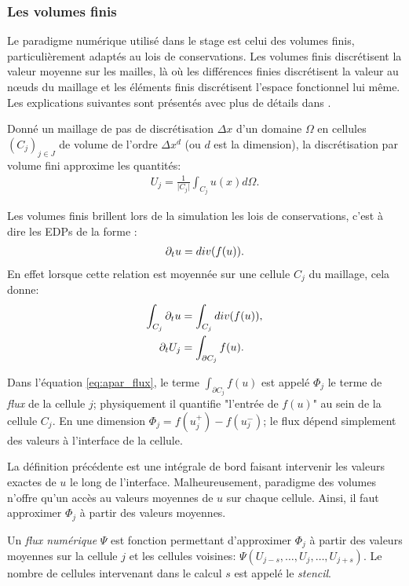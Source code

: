 \subsubsection{Les volumes finis}
    Le paradigme numérique utilisé dans le stage est celui des volumes finis, particulièrement adaptés au lois de conservations.
    Les volumes finis discrétisent la valeur moyenne sur les mailles, là où les différences finies discrétisent la valeur au nœuds du maillage et 
    les éléments finis discrétisent l'espace fonctionnel lui même. Les explications suivantes sont présentés avec plus de détails dans \cite{LeVeque1990}.
    \begin{definition}
        Donné un maillage de pas de discrétisation $\Delta x$ d'un domaine $\Omega$ en cellules $(C_j)_{j\in J}$ de volume de l'ordre $\Delta x^d$ (ou $d$ est la dimension), 
        la discrétisation par volume fini approxime les quantités:
        \begin{align}
            U_j = \frac{1}{\vert C_j \vert} \int_{C_j} u(x) d\Omega.
        \end{align}
    \end{definition}
    Les volumes finis brillent lors de la simulation les lois de conservations, c'est à dire les EDPs de la forme :
    \begin{align}
        \partial_t u = div(f(u)).
    \end{align}
    En effet lorsque cette relation est moyennée sur une cellule $C_j$ du maillage, cela donne: 
    \begin{align}
        \int_{C_j} \partial_t u&= \int_{C_j}  div(f(u)),\\
        \partial_t U_j &= \int_{\partial C_j} f(u).\label{eq:apar_flux}
    \end{align}
    \begin{definition}
        Dans l'équation \ref{eq:apar_flux}, le terme $\int_{\partial C_j} f(u)$ est appelé $\Phi_j$ le terme de \textit{flux} de la cellule $j$;
        physiquement il quantifie "l'entrée de $f(u)$" au sein de la cellule $C_j$. En une dimension $\Phi_j = f(u^+_j) - f(u^-_j)$;
        le flux dépend simplement des valeurs à l'interface de la cellule.
    \end{definition}
    La définition précédente est une intégrale de bord faisant intervenir les valeurs exactes de $u$ le long de l'interface.
    Malheureusement, paradigme des volumes n'offre qu'un accès au valeurs moyennes de $u$ sur chaque cellule.
    Ainsi, il faut approximer $\Phi_j$ à partir des valeurs moyennes.
    \begin{definition}
        Un \textit{flux numérique} $\Psi$ est fonction permettant d’approximer $\Phi_j$ à partir des valeurs moyennes sur la cellule $j$ et les cellules voisines:
        $\Psi(U_{j-s} , \ldots , U_j ,\ldots , U_{j+s})$. Le nombre de cellules intervenant dans le calcul $s$ est appelé le \textit{stencil}.
    \end{definition}

